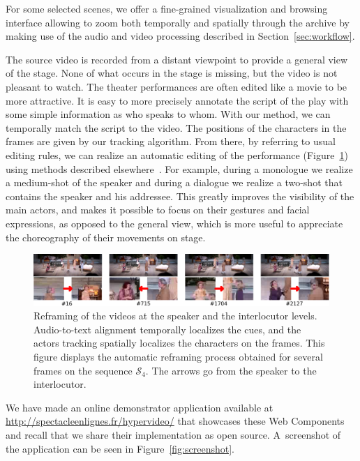 \documentclass[conference]{IEEEtran}
\begin{document}
For some selected scenes, we offer a fine-grained visualization and browsing interface allowing to zoom both temporally and spatially through the archive by making use of the audio and video processing described in Section~\ref{sec:workflow}.  

The source video  is recorded from a distant viewpoint  to provide  a general  view of the stage.  None of what occurs in the stage is missing, but the video is not pleasant to watch.  The theater performances are often edited like a movie to be more attractive.   It is easy to more precisely annotate the script of the play with some simple information as who speaks to whom. With our method, we can temporally match the script to the video.  The positions of the characters in the frames are given by our tracking algorithm.  From there, by referring to usual editing rules, we can realize an automatic editing of the performance (Figure~\ref{fig_speaker}) using methods described elsewhere~\cite{Gandhi14,Gandhi15}.  For example, during a monologue we realize a medium-shot of the speaker and during a dialogue we realize a two-shot that contains the speaker and his addressee. This greatly improves the visibility of the main actors, and makes it possible to focus on their gestures and facial expressions, as opposed to the general view, which is more useful to appreciate the choreography of their movements on stage.

\begin{figure}[tp]
\centering
\includegraphics[width=\textwidth]{speakers2}
\caption{Reframing of the videos at the speaker and the interlocutor levels. Audio-to-text alignment temporally localizes the cues, and the actors tracking spatially localizes the characters on the frames. 
This figure displays the automatic reframing process obtained for several frames on the sequence $\mathcal{S}_4$. The arrows go from the speaker to the interlocutor.}
\label{fig_speaker}
\end{figure}

\noindent We have made an online demonstrator application available at
\url{http://spectacleenlignes.fr/hypervideo/} that showcases these Web Components
and recall that we share their implementation as open source.
A~screenshot of the application can be seen in Figure~\ref{fig:screenshot}.
\end{document}

